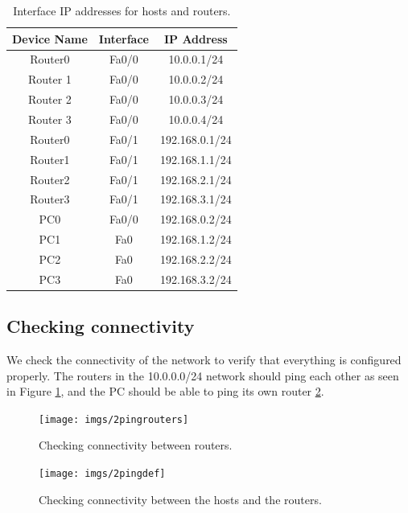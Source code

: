 \documentclass{article}
\begin{document}
\begin{table}[h]
\centering
\begin{tabular}{|c|c|c|}
\hline
Device Name & Interface & IP Address \\
\hline
Router0 & Fa0/0 & 10.0.0.1/24 \\
Router 1 & Fa0/0 &  10.0.0.2/24\\
Router 2 & Fa0/0 & 10.0.0.3/24\\
Router 3 & Fa0/0 & 10.0.0.4/24\\
Router0 & Fa0/1 & 192.168.0.1/24\\
Router1 & Fa0/1 & 192.168.1.1/24\\
Router2 & Fa0/1 & 192.168.2.1/24\\
Router3 & Fa0/1 & 192.168.3.1/24\\
PC0 & Fa0/0 & 192.168.0.2/24\\
PC1 & Fa0 & 192.168.1.2/24\\
PC2 & Fa0 & 192.168.2.2/24\\
PC3 & Fa0 & 192.168.3.2/24\\
\hline
\end{tabular}
\caption{Interface IP addresses for hosts and routers.}
\label{tab:2intip}
\end{table}


\subsection{Checking connectivity}

We check the connectivity of the network to verify that everything is configured properly. The routers in the 10.0.0.0/24 network should ping each other as seen in Figure \ref{fig:2pingrouters}, and the PC should be able to ping its own router  \ref{fig:2pingdef}. 

\begin{figure}[h]
\centering
\texttt{[image: imgs/2pingrouters]}
\caption{Checking connectivity between routers.}
\label{fig:2pingrouters}
\end{figure}

\begin{figure}[h]
\centering
\texttt{[image: imgs/2pingdef]}
\caption{Checking connectivity between the hosts and the routers.}
\label{fig:2pingdef}
\end{figure}
\end{document}
